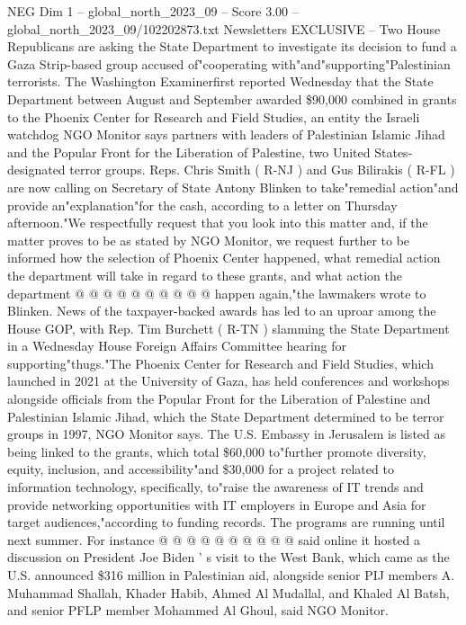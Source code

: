 \begin{textsample}{NEG Dim 1 – global\_north\_2023\_09 – Score 3.00 – global\_north\_2023\_09/102202873.txt}  \label{ex:f1_neg_092}
Newsletters EXCLUSIVE -- Two House Republicans are asking the State Department to investigate its decision to fund a Gaza Strip-based group accused of"cooperating with"and"supporting"Palestinian terrorists.
The Washington Examinerfirst reported Wednesday that the State Department between August and September awarded \$90,000 combined in grants to the Phoenix Center for Research and Field Studies, an entity the Israeli watchdog NGO Monitor says partners with leaders of Palestinian Islamic Jihad and the Popular Front for the Liberation of Palestine, two United States-designated terror groups.
Reps.
Chris Smith ( R-NJ ) and Gus Bilirakis ( R-FL ) are now calling on Secretary of State Antony Blinken to take"remedial action"and provide an"explanation"for the cash, according to a letter on Thursday afternoon."We respectfully request that you look into this matter and, if the matter proves to be as stated by NGO Monitor, we request further to be informed how the selection of Phoenix Center happened, what remedial action the department will take in regard to these grants, and what action the department @ @ @ @ @ @ @ @ @ @ happen again,"the lawmakers wrote to Blinken.
News of the taxpayer-backed awards has led to an uproar among the House GOP, with Rep.
Tim Burchett ( R-TN ) slamming the State Department in a Wednesday House Foreign Affairs Committee hearing for supporting"thugs."The Phoenix Center for Research and Field Studies, which launched in 2021 at the University of Gaza, has held conferences and workshops alongside officials from the Popular Front for the Liberation of Palestine and Palestinian Islamic Jihad, which the State Department determined to be terror groups in 1997, NGO Monitor says.
The U.S.
Embassy in Jerusalem is listed as being linked to the grants, which total \$60,000 to"further promote diversity, equity, inclusion, and accessibility"and \$30,000 for a project related to information technology, specifically, to"raise the awareness of IT trends and provide networking opportunities with IT employers in Europe and Asia for target audiences,"according to funding records.
The programs are running until next summer.
For instance @ @ @ @ @ @ @ @ @ @ said online it hosted a discussion on President Joe Biden ' s visit to the West Bank, which came as the U.S. announced \$316 million in Palestinian aid, alongside senior PIJ members A.
Muhammad Shallah, Khader Habib, Ahmed Al Mudallal, and Khaled Al Batsh, and senior PFLP member Mohammed Al Ghoul, said NGO Monitor.

\end{textsample}
